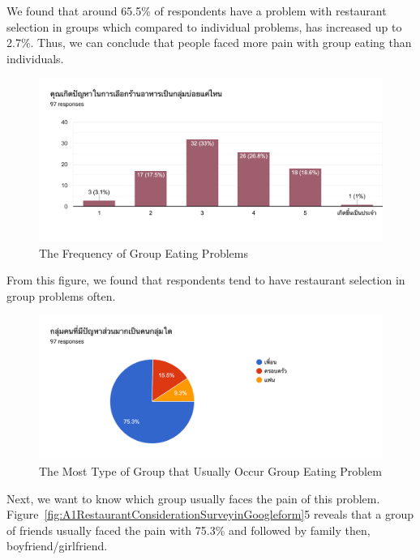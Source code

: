 \documentclass[12pt,oneside,openright,a4paper]{cpe-english-project}
\begin{document}
We found that around 65.5\% of respondents have a problem with restaurant selection in groups which compared to individual problems, has increased up to 2.7\%. Thus, we can conclude that people faced more pain with group eating than individuals.

\begin{figure}[H]\centering
\includegraphics[width=350pt]{./images/A1TheFrequencyofGroupEatingProblems.png}
\caption{The Frequency of Group Eating Problems}\label{fig:A1TheFrequencyofGroupEatingProblems}
\end{figure}\vspace{-24pt}

From this figure, we found that respondents tend to have restaurant selection in group problems often.

\begin{figure}[H]\centering
\includegraphics[width=350pt]{./images/A1TheMostTypeofGroupthatUsuallyOccurGroupEatingProblem.png}
\caption{The Most Type of Group that Usually Occur Group Eating Problem}\label{fig:A1TheMostTypeofGroupthatUsuallyOccurGroupEatingProblem}
\end{figure}\vspace{-24pt}

Next, we want to know which group usually faces the pain of this problem. Figure~\ref{fig:A1RestaurantConsiderationSurveyinGoogleform}5 reveals that a group of friends usually faced the pain with 75.3\% and followed by family then, boyfriend/girlfriend.
\end{document}
